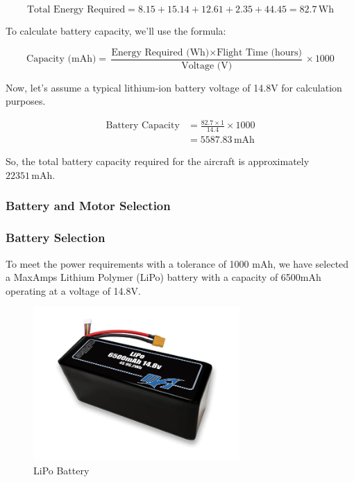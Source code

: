 \documentclass[12 pt]{article}
\begin{document}
\[
\text{Total Energy Required} = 8.15 + 15.14 + 12.61 + 2.35 + 44.45 = 82.7 \, \text{Wh}
\]

To calculate battery capacity, we'll use the formula:

\[
\text{Capacity (mAh)} = \frac{\text{Energy Required (Wh)} \times \text{Flight Time (hours)}}{\text{Voltage (V)}} \times 1000
\]

Now, let's assume a typical lithium-ion battery voltage of 14.8V for calculation purposes.

\begin{align*}
\text{Battery Capacity} &= \frac{82.7 \times 1}{14.4} \times 1000 \\
& = 5587.83 \, \text{mAh}
\end{align*}

So, the total battery capacity required for the aircraft is approximately $22351 \, \text{mAh}$.

\subsubsection{Battery and Motor Selection}

\subsubsection{Battery Selection}

To meet the power requirements with a tolerance of 1000 mAh, we have selected a MaxAmps Lithium Polymer (LiPo) battery with a capacity of 6500mAh operating at a voltage of 14.8V.

\begin{figure}[h]
    \centering
    \includegraphics[width=0.7\textwidth]{LIPO.jpg}
    \caption{LiPo Battery}
    \label{fig:battery}
\end{figure}
\end{document}
